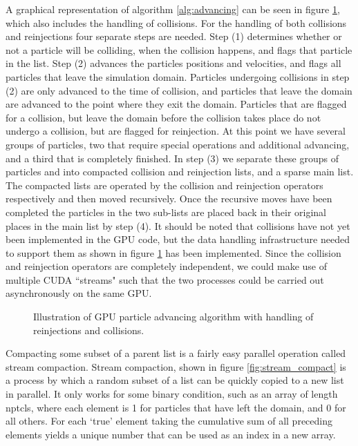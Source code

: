 A graphical representation of algorithm \ref{alg:advancing} can be seen in figure \ref{fig:padvnc}, which also includes the handling of collisions. For the handling of both collisions and reinjections four separate steps are needed. Step (1) determines whether or not a particle will be colliding, when the collision happens, and flags that particle in the list. Step (2) advances the particles positions and velocities, and flags all particles that leave the simulation domain. Particles undergoing collisions in step (2) are only advanced to the time of collision, and particles that leave the domain are advanced to the point where they exit the domain. Particles that are flagged for a collision, but leave the domain before the collision takes place do not undergo a collision, but are flagged for reinjection. At this point we have several groups of particles, two that require special operations and additional advancing, and a third that is completely finished. 
In step (3) we separate these groups of particles and into compacted collision and reinjection lists, and a sparse main list. The compacted lists are operated by the collision and reinjection operators respectively and then moved recursively. 
Once the recursive moves have been completed the particles in the two sub-lists are placed back in their original places in the main list by step (4). It should be noted that collisions have not yet been implemented in the GPU code, but the data handling infrastructure needed to support them as shown in figure \ref{fig:padvnc} has been implemented. 
Since the collision and reinjection operators are completely independent, we could make use of multiple CUDA ``streams" such that the two processes could be carried out asynchronously on the same GPU. 

\begin{figure}
\begin{center}

\end{center}
\caption{Illustration of GPU particle advancing algorithm with handling of reinjections and collisions.}
\label{fig:padvnc}
\end{figure}

Compacting some subset of a parent list is a fairly easy parallel operation called stream compaction. Stream compaction, shown in figure \ref{fig:stream_compact} is a process by which a random subset of a list can be quickly copied to a new list in parallel. It only works for some binary condition, such as an array of length nptcls, where each element is 1 for particles that have left the domain, and 0 for all others. For each `true' element taking the cumulative sum of all preceding elements yields a unique number that can be used as an index in a new array. 

